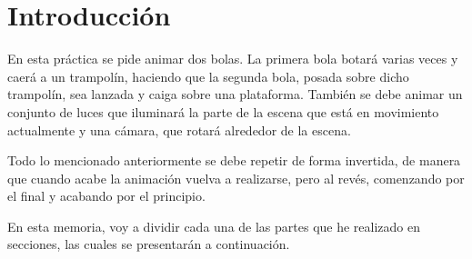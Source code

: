 \section{Introducción}
En esta práctica se pide animar dos bolas. La primera bola botará varias veces y caerá a un trampolín, haciendo que la segunda bola, posada sobre dicho trampolín, sea lanzada y caiga sobre una plataforma. También se debe animar un conjunto de luces que iluminará la parte de la escena que está en movimiento actualmente y una cámara, que rotará alrededor de la escena.

\bigskip

Todo lo mencionado anteriormente se debe repetir de forma invertida, de manera que cuando acabe la animación vuelva a realizarse, pero al revés, comenzando por el final y acabando por el principio.

\bigskip

En esta memoria, voy a dividir cada una de las partes que he realizado en secciones, las cuales se presentarán a continuación.
